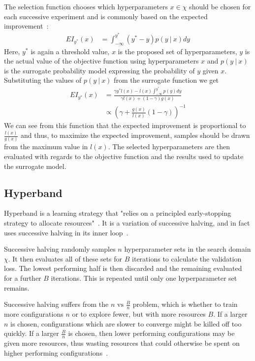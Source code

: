 The selection function chooses which hyperparameters $x \in \chi$ should be chosen for each successive experiment and is commonly based on the expected improvement~\cite{bayesiantds}:
\begin{align}
	EI_{y^*}(x) &= \int_{-\infty}^{y^*} (y^* - y) p(y~|~x)dy
\end{align}
Here, $y^*$ is again a threshold value, $x$ is the proposed set of hyperparameters, $y$ is the actual value of the objective function using hyperparameters $x$ and $p(y~|~x)$ is the surrogate probability model expressing the probability of $y$ given $x$.
Substituting the values of $p(y~|~x)$ from the surrogate function we get
\begin{equation}
	\begin{split}
		EI_{y^*}(x) &= \frac{\gamma y^* l(x) - l(x) \int_{-\infty}^{y^*}p(y)dy}{\gamma l(x) + (1 - \gamma)g(x)}\\
		&\propto \left(\gamma + \frac{g(x)}{l(x)} (1 - \gamma)\right)^{-1}
	\end{split}
\end{equation}
We can see from this function that the expected improvement is proportional to $\frac{l(x)}{g(x)}$ and thus, to maximize the expected improvement, samples should be drawn from the maximum value in $l(x)$.
The selected hyperparameters are then evaluated with regards to the objective function and the results used to update the surrogate model.

\subsection{Hyperband}\label{section:background-hyperband}
Hyperband is a learning strategy that "relies on a principled early-stopping strategy to allocate resources"~\cite{hyperband}. 
It is a variation of successive halving, and in fact uses successive halving in its inner loop~\cite{successivehalving}.

Successive halving randomly samples $n$ hyperparameter sets in the search domain $\chi$.
It then evaluates all of these sets for $B$ iterations to calculate the validation loss.
The lowest performing half is then discarded and the remaining evaluated for a further $B$ iterations.
This is repeated until only one hyperparameter set remains.

Successive halving suffers from the $n \text{ vs } \frac{B}{n}$ problem, which is whether to train more configurations $n$ or to explore fewer, but with more resources $B$.
If a larger $n$ is chosen, configurations which are slower to converge might be killed off too quickly.
If a larger $\frac{B}{n}$ is chosen, then lower performing configurations may be given more resources, thus wasting resources that could otherwise be spent on higher performing configurations~\cite{hyperband}.


